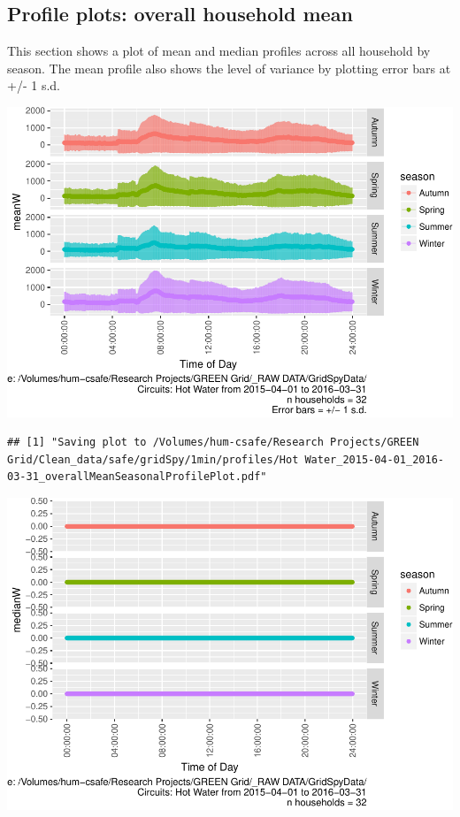 \documentclass[]{article}
\begin{document}
\subsection{Profile plots: overall household
mean}\label{profile-plots-overall-household-mean}

This section shows a plot of mean and median profiles across all
household by season. The mean profile also shows the level of variance
by plotting error bars at +/- 1 s.d.

\includegraphics{nzGGHouseholdPowerDemandProfile_Hot Water_2015-04-01_2016-03-31_files/figure-latex/overall profiles by season-1.pdf}

\begin{verbatim}
## [1] "Saving plot to /Volumes/hum-csafe/Research Projects/GREEN Grid/Clean_data/safe/gridSpy/1min/profiles/Hot Water_2015-04-01_2016-03-31_overallMeanSeasonalProfilePlot.pdf"
\end{verbatim}

\includegraphics{nzGGHouseholdPowerDemandProfile_Hot Water_2015-04-01_2016-03-31_files/figure-latex/overall profiles by season-2.pdf}
\end{document}
